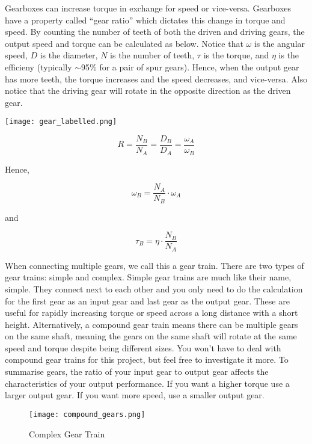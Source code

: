 \documentclass[../TinyBot.tex]{subfiles}
\begin{document}
\begin{minipage}[t]{0.6\textwidth}\vspace{0pt}

    Gearboxes can increase torque in exchange for speed or vice-versa. Gearboxes have
    a property called ``gear ratio'' which dictates this change in torque and speed.
    By counting the number of teeth of both the driven and driving gears, the output
    speed and torque can be calculated as below. Notice that $\omega$ is the angular
    speed, $D$ is the diameter, $N$ is the number of teeth, $\tau$ is the torque, and
    $\eta$ is the efficieny (typically $\sim$95\% for a pair of spur gears). Hence, when
    the output gear has more teeth, the torque increases and the speed decreases,
    and vice-versa. Also notice that the driving gear will rotate in the opposite
    direction as the driven gear. \\

\end{minipage}
\begin{minipage}[t]{0.4\textwidth}\vspace{0pt}
    \begin{center}
        \texttt{[image: gear\_labelled.png]}
        \label{fig:gear-driver-driven}
    \end{center}
\end{minipage}

\[ R = \frac{N_B}{N_A} = \frac{D_B}{D_A} = \frac{\omega_A}{\omega_B} \]

Hence,

\[ \omega_B = \frac{N_A}{N_B} \cdot \omega_A \]

and

\[ \tau_B = \eta \cdot \frac{N_B}{N_A} \]

When connecting multiple gears, we call this a gear train. There are two types of gear trains:
simple and complex. Simple gear trains are much like their name, simple. They connect next to
each other and you only need to do the calculation for the first gear as an input gear and last
gear as the output gear. These are useful for rapidly increasing torque or speed across a long
distance with a short height. Alternatively, a compound gear train means there can be multiple
gears on the same shaft, meaning the gears on the same shaft will rotate at the same speed and
torque despite being different sizes. You won’t have to deal with compound gear trains for this
project, but feel free to investigate it more. To summarise gears, the ratio of your input gear
to output gear affects the characteristics of your output performance. If you want a higher
torque use a larger output gear. If you want more speed, use a smaller output gear.

\begin{figure}[h]
    \centering
    \texttt{[image: compound\_gears.png]}
    \label{fig:gear-complex}
    \caption{Complex Gear Train}
\end{figure}
\end{document}
